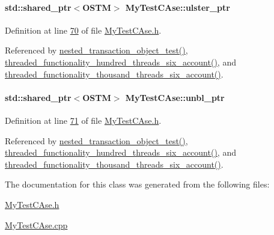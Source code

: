 \paragraph[{\texorpdfstring{ulster\+\_\+ptr}{ulster_ptr}}]{\setlength{\rightskip}{0pt plus 5cm}std\+::shared\+\_\+ptr$<${\bf O\+S\+TM}$>$ My\+Test\+C\+Ase\+::ulster\+\_\+ptr}\hypertarget{class_my_test_c_ase_a4f9f72374d3d15be7cdf16412c4d7ed3_a4f9f72374d3d15be7cdf16412c4d7ed3}{}\label{class_my_test_c_ase_a4f9f72374d3d15be7cdf16412c4d7ed3_a4f9f72374d3d15be7cdf16412c4d7ed3}


Definition at line \hyperlink{_my_test_c_ase_8h_source_l00070}{70} of file \hyperlink{_my_test_c_ase_8h_source}{My\+Test\+C\+Ase.\+h}.



Referenced by \hyperlink{_my_test_c_ase_8cpp_source_l00787}{nested\+\_\+transaction\+\_\+object\+\_\+test()}, \hyperlink{_my_test_c_ase_8cpp_source_l00589}{threaded\+\_\+functionality\+\_\+hundred\+\_\+threads\+\_\+six\+\_\+account()}, and \hyperlink{_my_test_c_ase_8cpp_source_l00634}{threaded\+\_\+functionality\+\_\+thousand\+\_\+threads\+\_\+six\+\_\+account()}.

\paragraph[{\texorpdfstring{unbl\+\_\+ptr}{unbl_ptr}}]{\setlength{\rightskip}{0pt plus 5cm}std\+::shared\+\_\+ptr$<${\bf O\+S\+TM}$>$ My\+Test\+C\+Ase\+::unbl\+\_\+ptr}\hypertarget{class_my_test_c_ase_a0ca634b597d6c0e136d632268853d5a7_a0ca634b597d6c0e136d632268853d5a7}{}\label{class_my_test_c_ase_a0ca634b597d6c0e136d632268853d5a7_a0ca634b597d6c0e136d632268853d5a7}


Definition at line \hyperlink{_my_test_c_ase_8h_source_l00071}{71} of file \hyperlink{_my_test_c_ase_8h_source}{My\+Test\+C\+Ase.\+h}.



Referenced by \hyperlink{_my_test_c_ase_8cpp_source_l00787}{nested\+\_\+transaction\+\_\+object\+\_\+test()}, \hyperlink{_my_test_c_ase_8cpp_source_l00589}{threaded\+\_\+functionality\+\_\+hundred\+\_\+threads\+\_\+six\+\_\+account()}, and \hyperlink{_my_test_c_ase_8cpp_source_l00634}{threaded\+\_\+functionality\+\_\+thousand\+\_\+threads\+\_\+six\+\_\+account()}.



The documentation for this class was generated from the following files\+:\begin{DoxyCompactItemize}
\item 
\hyperlink{_my_test_c_ase_8h}{My\+Test\+C\+Ase.\+h}\item 
\hyperlink{_my_test_c_ase_8cpp}{My\+Test\+C\+Ase.\+cpp}\end{DoxyCompactItemize}
